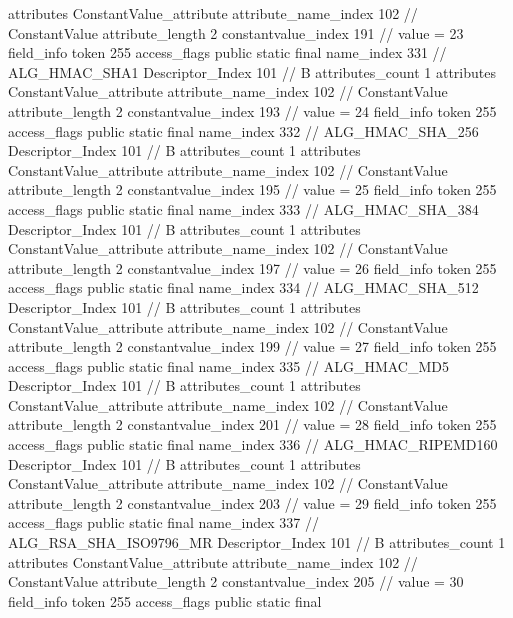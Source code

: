{{{{{				attributes {
				ConstantValue_attribute {
					attribute_name_index	102		// ConstantValue
					attribute_length	2
					constantvalue_index	191		// value = 23
				}
				}
			}
			field_info {
				token	255
				access_flags	public static final
				name_index	331		// ALG_HMAC_SHA1
				Descriptor_Index	101		// B
				attributes_count	1
				attributes {
				ConstantValue_attribute {
					attribute_name_index	102		// ConstantValue
					attribute_length	2
					constantvalue_index	193		// value = 24
				}
				}
			}
			field_info {
				token	255
				access_flags	public static final
				name_index	332		// ALG_HMAC_SHA_256
				Descriptor_Index	101		// B
				attributes_count	1
				attributes {
				ConstantValue_attribute {
					attribute_name_index	102		// ConstantValue
					attribute_length	2
					constantvalue_index	195		// value = 25
				}
				}
			}
			field_info {
				token	255
				access_flags	public static final
				name_index	333		// ALG_HMAC_SHA_384
				Descriptor_Index	101		// B
				attributes_count	1
				attributes {
				ConstantValue_attribute {
					attribute_name_index	102		// ConstantValue
					attribute_length	2
					constantvalue_index	197		// value = 26
				}
				}
			}
			field_info {
				token	255
				access_flags	public static final
				name_index	334		// ALG_HMAC_SHA_512
				Descriptor_Index	101		// B
				attributes_count	1
				attributes {
				ConstantValue_attribute {
					attribute_name_index	102		// ConstantValue
					attribute_length	2
					constantvalue_index	199		// value = 27
				}
				}
			}
			field_info {
				token	255
				access_flags	public static final
				name_index	335		// ALG_HMAC_MD5
				Descriptor_Index	101		// B
				attributes_count	1
				attributes {
				ConstantValue_attribute {
					attribute_name_index	102		// ConstantValue
					attribute_length	2
					constantvalue_index	201		// value = 28
				}
				}
			}
			field_info {
				token	255
				access_flags	public static final
				name_index	336		// ALG_HMAC_RIPEMD160
				Descriptor_Index	101		// B
				attributes_count	1
				attributes {
				ConstantValue_attribute {
					attribute_name_index	102		// ConstantValue
					attribute_length	2
					constantvalue_index	203		// value = 29
				}
				}
			}
			field_info {
				token	255
				access_flags	public static final
				name_index	337		// ALG_RSA_SHA_ISO9796_MR
				Descriptor_Index	101		// B
				attributes_count	1
				attributes {
				ConstantValue_attribute {
					attribute_name_index	102		// ConstantValue
					attribute_length	2
					constantvalue_index	205		// value = 30
				}
				}
			}
			field_info {
				token	255
				access_flags	public static final
}}}}}
